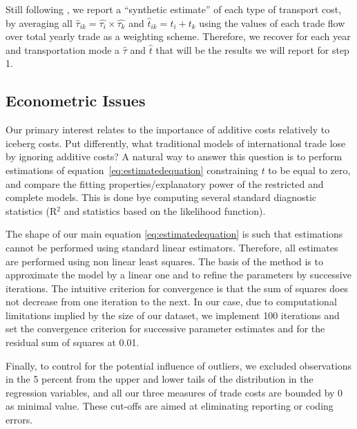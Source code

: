 \documentclass[a4paper,11pt]{article}
\begin{document}
Still following \citet{Irrazabal_2015}, we report a ``synthetic estimate'' of each type of transport cost, by averaging all $\widehat{\tau}_{ik} = \widehat{\tau_{i}} \times \widehat{\tau_{k}}$ and $\widehat{t}_{ik} = t_{i} + t_{k}$ using the values of each trade flow over total yearly trade as a weighting scheme. Therefore, we recover for each year and transportation mode a $\widehat{\tau}$ and $\widehat{t}$ that will be the results we will report for step 1.\\

\subsection{Econometric Issues}

\noindent Our primary interest relates to the importance of additive costs relatively to iceberg costs. Put differently, what traditional models of international trade lose by ignoring additive costs? A natural way to answer this question is to perform estimations of equation~\ref{eq:estimatedequation} constraining $t$ to be equal to zero, and compare the fitting properties/explanatory power of the restricted and complete models. This is done bye computing several standard diagnostic statistics (R$^{2}$ and statistics based on the likelihood function).

The shape of our main equation \ref{eq:estimatedequation} is such that estimations cannot be performed using standard linear estimators. Therefore, all estimates are performed using non linear least squares. The basis of the method is to approximate the model by a linear one and to refine the parameters by successive iterations. The intuitive criterion for convergence is that the sum of squares does not decrease from one iteration to the next. In our case, due to computational limitations implied by the size of our dataset, we implement 100 iterations and set the convergence criterion for successive parameter estimates and for the residual sum of squares at 0.01.

Finally, to control for the potential influence of outliers, we excluded observations in the 5 percent from the upper and lower tails of the distribution in the regression variables, and all our three measures of trade costs are bounded by 0 as minimal value. These cut-offs are aimed at eliminating reporting or coding errors. %


\end{document}
